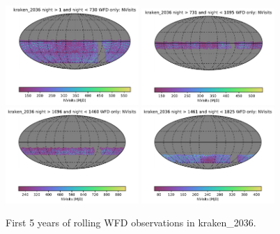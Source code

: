 \documentclass[DM,authoryear,toc]{lsstdoc}
\begin{document}
\begin{figure}[ht]
\centering
\includegraphics[width=0.45\textwidth]{figures/kraken_2036_NVisits_night_gt_1_and_night_lt_730_WFD_only_HEAL_SkyMap.pdf}
\includegraphics[width=0.45\textwidth]{figures/kraken_2036_NVisits_night_gt_731_and_night_lt_1095_WFD_only_HEAL_SkyMap.pdf} \\
\includegraphics[width=0.45\textwidth]{figures/kraken_2036_NVisits_night_gt_1096_and_night_lt_1460_WFD_only_HEAL_SkyMap.pdf}
\includegraphics[width=0.45\textwidth]{figures/kraken_2036_NVisits_night_gt_1461_and_night_lt_1825_WFD_only_HEAL_SkyMap.pdf}
\caption{First 5 years of rolling WFD observations in  kraken\_2036.}
\label{fig:rolling_nvis-2036}
\end{figure}
\end{document}
